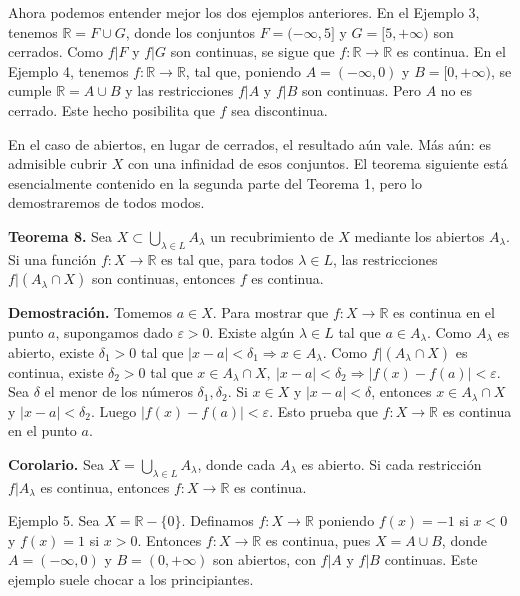\documentclass[12pt,oneside]{book}
\begin{document}
Ahora podemos entender mejor los dos ejemplos anteriores. En el Ejemplo 3, tenemos \(\mathbb{R} = F \cup G\), donde los conjuntos \(F = (-\infty, 5]\) y \(G = [5, +\infty)\) son cerrados. Como \(f|F\) y \(f|G\) son continuas, se sigue que \(f: \mathbb{R} \to \mathbb{R}\) es continua. En el Ejemplo 4, tenemos \(f: \mathbb{R} \to \mathbb{R}\), tal que, poniendo \(A = (-\infty, 0)\) y \(B = [0, +\infty)\), se cumple \(\mathbb{R} = A \cup B\) y las restricciones \(f|A\) y \(f|B\) son continuas. Pero \(A\) no es cerrado. Este hecho posibilita que \(f\) sea discontinua.

En el caso de abiertos, en lugar de cerrados, el resultado aún vale. Más aún: es admisible cubrir \(X\) con una infinidad de esos conjuntos. El teorema siguiente está esencialmente contenido en la segunda parte del Teorema 1, pero lo demostraremos de todos modos.

\textbf{Teorema 8.} Sea \(X \subset \bigcup_{\lambda \in L} A_\lambda\) un recubrimiento de \(X\) mediante los abiertos \(A_\lambda\). Si una función \(f: X \to \mathbb{R}\) es tal que, para todos \(\lambda \in L\), las restricciones \(f|(A_\lambda \cap X)\) son continuas, entonces \(f\) es continua.

\textbf{Demostración.} Tomemos \(a \in X\). Para mostrar que \(f: X \to \mathbb{R}\) es continua en el punto \(a\), supongamos dado \(\varepsilon > 0\). Existe algún \(\lambda \in L\) tal que \(a \in A_\lambda\). Como \(A_\lambda\) es abierto, existe \(\delta_1 > 0\) tal que \(|x - a| < \delta_1 \Rightarrow x \in A_\lambda\). Como \(f|(A_\lambda \cap X)\) es continua, existe \(\delta_2 > 0\) tal que \(x \in A_\lambda \cap X,\ |x - a| < \delta_2 \Rightarrow |f(x) - f(a)| < \varepsilon\). Sea \(\delta\) el menor de los números \(\delta_1, \delta_2\). Si \(x \in X\) y \(|x - a| < \delta\), entonces \(x \in A_\lambda \cap X\) y \(|x - a| < \delta_2\). Luego \(|f(x) - f(a)| < \varepsilon\). Esto prueba que \(f: X \to \mathbb{R}\) es continua en el punto \(a\).

\textbf{Corolario.} Sea \(X = \bigcup_{\lambda \in L} A_\lambda\), donde cada \(A_\lambda\) es abierto. Si cada restricción \(f|A_\lambda\) es continua, entonces \(f: X \to \mathbb{R}\) es continua.

Ejemplo 5. Sea \(X = \mathbb{R} - \{0\}\). Definamos \(f: X \to \mathbb{R}\) poniendo \(f(x) = -1\) si \(x < 0\) y \(f(x) = 1\) si \(x > 0\). Entonces \(f: X \to \mathbb{R}\) es continua, pues \(X = A \cup B\), donde \(A = (-\infty, 0)\) y \(B = (0, +\infty)\) son abiertos, con \(f|A\) y \(f|B\) continuas. Este ejemplo suele chocar a los principiantes.
\end{document}
